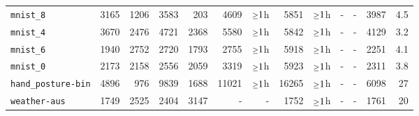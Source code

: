 \begin{tabular}{lrrrrrrrrrrrr}
\texttt{mnist\_8} & 3165 & 1206 & 3583 & 203 & 4609 & $\mathsmaller{\geq}1$h & 5851 & $\mathsmaller{\geq}1$h & - & - & 3987 & 4.5\\
\texttt{mnist\_4} & 3670 & 2476 & 4721 & 2368 & 5580 & $\mathsmaller{\geq}1$h & 5842 & $\mathsmaller{\geq}1$h & - & - & 4129 & 3.2\\
\texttt{mnist\_6} & 1940 & 2752 & 2720 & 1793 & 2755 & $\mathsmaller{\geq}1$h & 5918 & $\mathsmaller{\geq}1$h & - & - & 2251 & 4.1\\
\texttt{mnist\_0} & 2173 & 2158 & 2556 & 2059 & 3319 & $\mathsmaller{\geq}1$h & 5923 & $\mathsmaller{\geq}1$h & - & - & 2311 & 3.8\\
\texttt{hand\_posture-bin} & 4896 & 976 & 9839 & 1688 & 11021 & $\mathsmaller{\geq}1$h & 16265 & $\mathsmaller{\geq}1$h & - & - & 6098 & 27\\
\texttt{weather-aus} & 1749 & 2525 & 2404 & 3147 & - & - & 1752 & $\mathsmaller{\geq}1$h & - & - & 1761 & 20\\
\bottomrule
\end{tabular}
